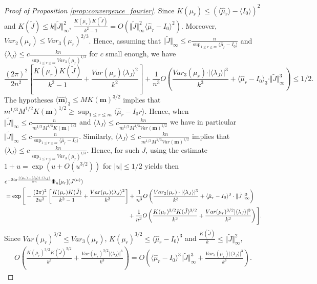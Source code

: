 \documentclass[10pt,11pt]{amsart}%
\begin{document}
\begin{proof}[Proof of Proposition \ref{prop:convergence_fourier}]
Since $K(\mu_r)\leq (\langle\hat{\mu}_r\rangle-\langle I_0\rangle)^2$ and $K(\tilde{J})\leq k\Vert \tilde{J}\Vert_{\infty}^2$, $\frac{K(\mu_r)K(\tilde{J})}{k^2-1}=O(\Vert \tilde{J}\Vert_{\infty}^2 \langle\hat{\mu}_r-I_0\rangle^2)$. Moreover, $Var_2(\mu_r)\leq Var_3(\mu_r)^{2/3}$. Hence, assuming that $\Vert \tilde{J}\Vert_{\infty}\leq c\frac{n}{\sup_{1\leq r\leq m}\langle\hat{\mu}_r-I_0\rangle}$ and $\langle \lambda_J\rangle\leq c\frac{kn}{\sup_{1\leq r\leq m}Var_3(\mu_r)^{1/3}}$ for $c$ small enough, we have 
$$\frac{(2\pi)^2}{2n^2}\left[\frac{K(\mu_r)K(\tilde{J})}{k^2-1}+\frac{Var(\mu_r)\langle \lambda_J\rangle^2}{k^2}\right]+\frac{1}{n^3}O\left(\frac{Var_3(\mu_r)\cdot\vert\langle \lambda_J\rangle\vert^3}{k^3}+\langle\hat{\mu}_r-I_0\rangle_3\cdot\Vert \tilde{J}\Vert_\infty^3\right)\leq 1/2.$$
The hypotheses $\langle\hat{\mathbf{m}}\rangle_3\leq M K(\mathbf{m})^{3/2}$ implies that $m^{1/3}M^{1/2}K(\mathbf{m})^{1/2}\geq \sup_{1\leq r\leq m} \langle\hat{\mu}_r-I_0r\rangle$. Hence, when $\Vert \tilde{J}\Vert_{\infty}\leq c\frac{n}{m^{1/3}M^{1/3}K(\mathbf{m})^{1/2}}$ and $\langle \lambda_J\rangle\leq c\frac{kn}{m^{1/3}M^{1/3}Var(\mathbf{m})^{1/2}}$ we have in particular  $\Vert \tilde{J}\Vert_{\infty}\leq c\frac{n}{\sup_{1\leq r\leq m}\langle\hat{\mu}_r-I_0\rangle}$. Similarly,  $\langle \lambda_J\rangle\leq c\frac{kn}{m^{1/3}M^{1/3}Var(\mathbf{m})^{1/2}}$ implies that $\langle \lambda_J\rangle\leq c\frac{kn}{\sup_{1\leq r\leq m}Var_3(\mu_r)^{1/3}}$. Hence, for such $J$, using the estimate $1+u=\exp(u+O(u^{3/2}))$ for $\vert u\vert\leq 1/2$ yields then
\begin{align*}
&e^{-2i\pi\frac{(\langle\mu_r\rangle-\langle I_0\rangle)\cdot\langle \lambda_J\rangle}{kn}}\Phi_{n}[\mu_r](J^{(n)})\\
&=\exp\Bigg[-\frac{(2\pi)^2}{2n^2}\left[\frac{K(\mu_r)K(\tilde{J})}{k^2-1}+\frac{Var(\mu_r)\langle \lambda_J\rangle^2}{k^2}\right]
+\frac{1}{n^3}O\left(\frac{Var_3(\mu_r)\cdot\vert\langle \lambda_J\rangle\vert^3}{k^3}+\langle\hat{\mu}_r-I_0\rangle^3\cdot\Vert \tilde{J}\Vert_\infty^3\right)\\
&\hspace{7.5cm}+\frac{1}{n^3}O\left(\frac{K(\mu_r)^{3/2}K(\tilde{J})^{3/2}}{k^3}+\frac{Var(\mu_r)^{3/2}\vert\langle \lambda_J\rangle\vert^3}{k^3}\right)\Bigg].
\end{align*}
Since $Var(\mu_r)^{3/2}\leq Var_3(\mu_r)$, $K(\mu_r)^{3/2}\leq \langle\hat{\mu}_r-I_0\rangle^3$ and $\frac{K(\tilde{J})}{k}\leq \Vert \tilde{J}\Vert_{\infty}^2$, 
\begin{align*}
O\left(\frac{K(\mu_r)^{3/2}K(\tilde{J})^{3/2}}{k^3}+\frac{Var(\mu_r)^{3/2}\vert\langle \lambda_J\rangle\vert^3}{k^3}\right)=O\left(\langle\hat{\mu}_r-I_0\rangle^3\Vert \tilde{J}\Vert_{\infty}^3+\frac{Var_3(\mu_r)\vert\langle \lambda_J\rangle\vert^3}{k^3}\right).

\end{align*}
\end{proof}
\end{document}
